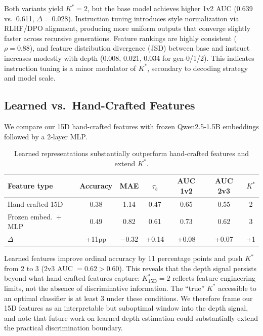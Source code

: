 \documentclass[11pt]{article}
\begin{document}
Both variants yield $K^*{=}2$, but the base model achieves higher 1v2 AUC (0.639 vs.\ 0.611, $\Delta = 0.028$). Instruction tuning introduces style normalization via RLHF/DPO alignment, producing more uniform outputs that converge slightly faster across recursive generations. Feature rankings are highly consistent ($\rho = 0.88$), and feature distribution divergence (JSD) between base and instruct increases modestly with depth (0.008, 0.021, 0.034 for gen-0/1/2). This indicates instruction tuning is a minor modulator of $K^*$, secondary to decoding strategy and model scale.

\subsection{Learned vs.\ Hand-Crafted Features}
\label{sec:learned}

We compare our 15D hand-crafted features with frozen Qwen2.5-1.5B embeddings followed by a 2-layer MLP.

\begin{table}[h]
\centering
\caption{Learned representations substantially outperform hand-crafted features and extend $K^*$.}
\label{tab:learned}
\begin{tabular}{lcccccc}
\toprule
Feature type & Accuracy & MAE & $\tau_b$ & AUC 1v2 & AUC 2v3 & $K^*$ \\
\midrule
Hand-crafted 15D & 0.38 & 1.14 & 0.47 & 0.65 & 0.55 & 2 \\
Frozen embed.\ + MLP & 0.49 & 0.82 & 0.61 & 0.73 & 0.62 & 3 \\
\midrule
$\Delta$ & +11pp & $-$0.32 & +0.14 & +0.08 & +0.07 & +1 \\
\bottomrule
\end{tabular}
\end{table}

Learned features improve ordinal accuracy by 11 percentage points and push $K^*$ from 2 to 3 (2v3 AUC $= 0.62 > 0.60$). This reveals that the depth signal persists beyond what hand-crafted features capture: $K^*_{15\text{D}} = 2$ reflects feature engineering limits, not the absence of discriminative information. The ``true'' $K^*$ accessible to an optimal classifier is at least 3 under these conditions. We therefore frame our 15D features as an interpretable but suboptimal window into the depth signal, and note that future work on learned depth estimation could substantially extend the practical discrimination boundary.
\end{document}
